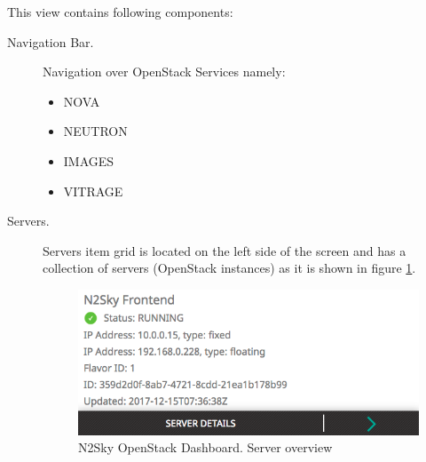 This view contains following components:
\begin{description}
\item[Navigation Bar.] Navigation over OpenStack Services namely:
\begin{itemize}
\item NOVA
\item NEUTRON
\item IMAGES
\item VITRAGE
\end{itemize}
 
 \item[Servers.] Servers item grid is located on the left side of the screen and has a collection of servers (OpenStack instances) as it is shown in figure \ref{fig:openstack_servers}. 
 
 \begin{figure}[htbp]
\begin{center}
  \includegraphics[scale=0.6]{components/4/pics/openstack_servers.png}
  \caption{N2Sky OpenStack Dashboard. Server overview}
  \label{fig:openstack_servers}
\end{center}
\end{figure}


\end{description}
